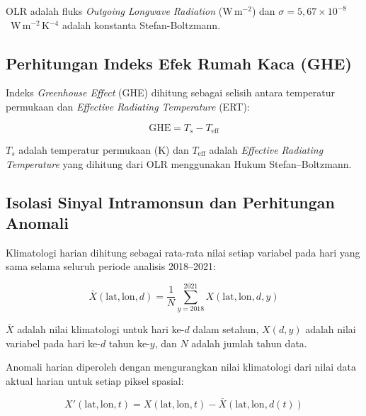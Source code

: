 \documentclass[12pt,a4paper]{report}
\begin{document}
\noindent
$\mathrm{OLR}$ adalah fluks \textit{Outgoing Longwave Radiation}
(W\,m$^{-2}$) dan
$\sigma = 5{,}67 \times 10^{-8}$~W\,m$^{-2}$\,K$^{-4}$
adalah konstanta Stefan-Boltzmann.
\subsection{Perhitungan Indeks Efek Rumah Kaca (GHE)}

Indeks \textit{Greenhouse Effect} (GHE) dihitung sebagai selisih antara
temperatur permukaan dan \textit{Effective Radiating Temperature} (ERT):

\begin{equation}
  \mathrm{GHE} = T_s - T_{\mathrm{eff}}
  \label{eq:ghe}
\end{equation}

\noindent
$T_s$ adalah temperatur permukaan (K) dan
$T_{\mathrm{eff}}$ adalah \textit{Effective Radiating Temperature} yang
dihitung dari OLR menggunakan Hukum Stefan--Boltzmann.
\subsection{Isolasi Sinyal Intramonsun dan Perhitungan Anomali}

Klimatologi harian dihitung sebagai rata-rata nilai setiap variabel pada hari yang sama selama seluruh periode analisis 2018--2021:

\begin{equation}
  \bar{X}(\mathrm{lat},\mathrm{lon},d) =
  \frac{1}{N} \sum_{y=2018}^{2021}
  X(\mathrm{lat},\mathrm{lon},d,y)
  \label{eq:climatology}
\end{equation}

\noindent
$\bar{X}$ adalah nilai klimatologi untuk hari ke-$d$ dalam setahun,
$X(d,y)$ adalah nilai variabel pada hari ke-$d$ tahun ke-$y$, dan $N$ adalah
jumlah tahun data.

Anomali harian diperoleh dengan mengurangkan nilai klimatologi dari nilai data
aktual harian untuk setiap piksel spasial:

\begin{equation}
  X'(\mathrm{lat},\mathrm{lon},t) =
  X(\mathrm{lat},\mathrm{lon},t) -
  \bar{X}\!\left(\mathrm{lat},\mathrm{lon},d(t)\right)
  \label{eq:anomaly}
\end{equation}
\end{document}
